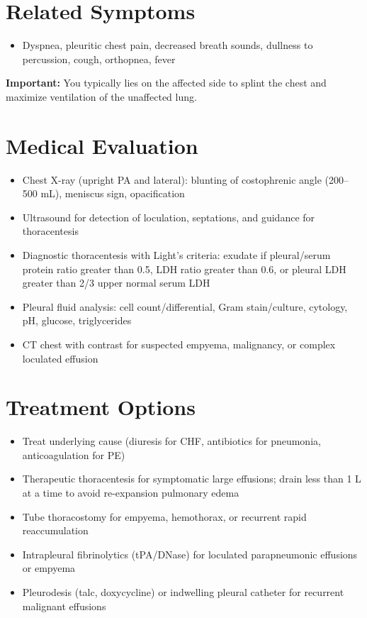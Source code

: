\section*{Related Symptoms}
\begin{itemize}
  \item Dyspnea, pleuritic chest pain, decreased breath sounds, dullness to percussion, cough, orthopnea, fever
\end{itemize}
\textbf{Important:} You typically lies on the affected side to splint the chest and maximize ventilation of the unaffected lung.

\section*{Medical Evaluation}
\begin{itemize}
  \item Chest X-ray (upright PA and lateral): blunting of costophrenic angle (200--500 mL), meniscus sign, opacification
  \item Ultrasound for detection of loculation, septations, and guidance for thoracentesis
  \item Diagnostic thoracentesis with Light's criteria: exudate if pleural/serum protein ratio greater than 0.5, LDH ratio greater than 0.6, or pleural LDH greater than 2/3 upper normal serum LDH
  \item Pleural fluid analysis: cell count/differential, Gram stain/culture, cytology, pH, glucose, triglycerides
  \item CT chest with contrast for suspected empyema, malignancy, or complex loculated effusion
\end{itemize}

\section*{Treatment Options}
\begin{itemize}
  \item Treat underlying cause (diuresis for CHF, antibiotics for pneumonia, anticoagulation for PE)
  \item Therapeutic thoracentesis for symptomatic large effusions; drain less than 1 L at a time to avoid re-expansion pulmonary edema
  \item Tube thoracostomy for empyema, hemothorax, or recurrent rapid reaccumulation
  \item Intrapleural fibrinolytics (tPA/DNase) for loculated parapneumonic effusions or empyema
  \item Pleurodesis (talc, doxycycline) or indwelling pleural catheter for recurrent malignant effusions
\end{itemize}

